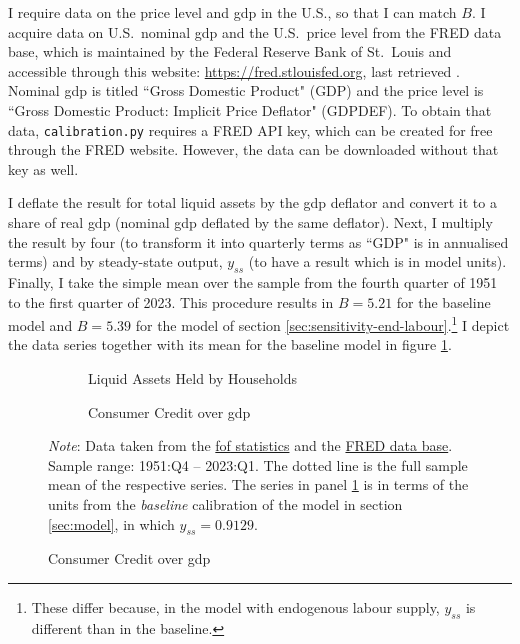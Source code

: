 \documentclass[a4paper,12pt]{article} %
\numberwithin{equation}{section} %
\numberwithin{figure}{section}
\numberwithin{table}{section}
\begin{document}
\begin{refsection}
\begin{appendices}
I require data on the price level and \Gls{gdp} in the U.S., so that I can match $B$. I acquire data on U.S.~nominal \Gls{gdp} and the U.S.~price level from the FRED data base, which is maintained by the Federal Reserve Bank of St.~Louis and accessible through this website: \url{https://fred.stlouisfed.org}, last retrieved . Nominal \Gls{gdp} is titled ``Gross Domestic Product" (GDP) and the price level is ``Gross Domestic Product: Implicit Price Deflator" (GDPDEF). To obtain that data, \texttt{calibration.py} requires a FRED API key, which can be created for free through the FRED website. However, the data can be downloaded without that key as well.

I deflate the result for total liquid assets by the \Gls{gdp} deflator and convert it to a share of real \Gls{gdp} (nominal \Gls{gdp} deflated by the same deflator). Next, I multiply the result by four (to transform it into quarterly terms as ``GDP" is in annualised terms) and by steady-state output, $y_{ss}$ (to have a result which is in model units). Finally, I take the simple mean over the sample from the fourth quarter of 1951 to the first quarter of 2023. This procedure results in $B=5.21$ for the baseline model and $B=5.39$ for the model of section \ref{sec:sensitivity-end-labour}.\footnote{These differ because, in the model with endogenous labour supply, $y_{ss}$ is different than in the baseline.} I depict the data series together with its mean for the baseline model in figure \ref{fig:app-calibration-liquid}.

\begin{figure}[t]
    \caption{Data for the Baseline Model Calibration}
    \label{fig:app-calibration}
    \centering
    \begin{subfigure}[b]{0.49\textwidth}
    \caption{Liquid Assets Held by Households}
    \label{fig:app-calibration-liquid}
         \centering
         
     \end{subfigure}
     \hfill
     \begin{subfigure}[b]{0.49\textwidth}
     \caption{Consumer Credit over \Gls{gdp}} 
    \label{fig:app-calibration-debt}
         \centering
         
     \end{subfigure}

    \vspace{10pt}
    
    \begin{minipage}{\textwidth} 
    \footnotesize
    \textit{Note}: Data taken from the \href{https://www.federalreserve.gov/releases/z1/}{\Gls{fof} statistics} and the \href{https://fred.stlouisfed.org}{FRED data base}. Sample range: 1951:Q4 -- 2023:Q1. The dotted line is the full sample mean of the respective series. The series in panel \ref{fig:app-calibration-liquid} is in terms of the units from the \textit{baseline} calibration of the model in section \ref{sec:model}, in which $y_{ss} = 0.9129$. 
    \end{minipage}
\end{figure}


\end{appendices}
\end{refsection}
\end{document}
